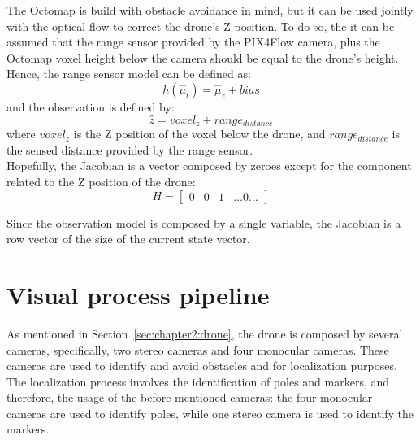 The Octomap is build with obstacle avoidance in mind, but it can be used jointly with the optical flow to correct the drone's Z position. To do so, the it can be assumed that the range sensor provided by the PIX4Flow camera, plus the Octomap voxel height below the camera should be equal to the drone's height. Hence, the range sensor model can be defined as:
\begin{equation}
    h\left(\hat\mu_t\right) = \hat\mu_z + bias
\end{equation}
and the observation is defined by:
\begin{equation}
    \hat{z} = voxel_z + range_{distance}
\end{equation}
where $voxel_z$ is the Z position of the voxel below the drone, and $range_{distance}$ is the sensed distance provided by the range sensor.\\

Hopefully, the Jacobian is a vector composed by zeroes except for the component related to the Z position of the drone:
\begin{equation}
    H = \begin{bmatrix}
        0 & 0 & 1 & \dots0\dots
    \end{bmatrix}
\end{equation}

Since the observation model is composed by a single variable, the Jacobian is a row vector of the size of the current state vector.


\section{Visual process pipeline}
\label{sec:chapter2:visual}
As mentioned in Section~\ref{sec:chapter2:drone}, the drone is composed by several cameras, specifically, two stereo cameras and four monocular cameras. These cameras are used to identify and avoid obstacles and for localization purposes. The localization process involves the identification of poles and markers, and therefore, the usage of the before mentioned cameras: the four monocular cameras are used to identify poles, while one stereo camera is used to identify the markers.
